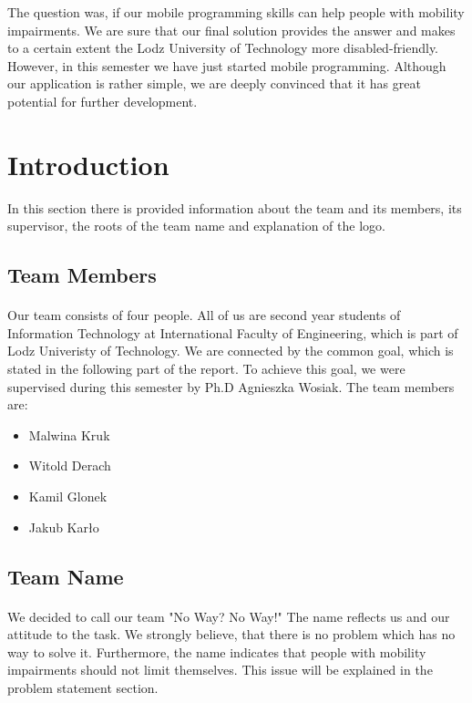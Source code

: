 \documentclass[12pt]{article}
\begin{document}
The question was, if our mobile programming skills can help people with mobility impairments. We are sure that our final solution provides the answer and  makes to a certain extent the Lodz University of Technology more disabled-friendly. However, in this semester we have just started mobile programming. Although our application is rather simple, we are deeply convinced that it has great potential for further development.

\cleardoublepage

\tableofcontents
\thispagestyle{empty}

\newpage

\setcounter{page}{2}
\section{Introduction}
In this section there is provided information about the team and its members, its supervisor, the roots of the team name and explanation of the logo.
\subsection{Team Members}
\paragraph{} Our team consists of four people. All of us are second year students of Information Technology at International Faculty of Engineering, which is part of Lodz Univeristy of Technology.
We are connected by the common goal, which is stated in the following part of the report. To achieve this goal, we were supervised during this semester by Ph.D Agnieszka Wosiak. The team members are:
\begin{itemize}
\item Malwina Kruk
\item Witold Derach
\item Kamil Glonek
\item Jakub Kar\l{}o
\end{itemize}

\subsection{Team Name}
\paragraph{} We decided to call our team "No Way? No Way!" The name reflects us and our attitude to the task. We strongly believe, that there is no problem which has no way to solve it. Furthermore, the name indicates that people with mobility impairments should not limit themselves. This issue will be explained in the problem statement section.
\end{document}
